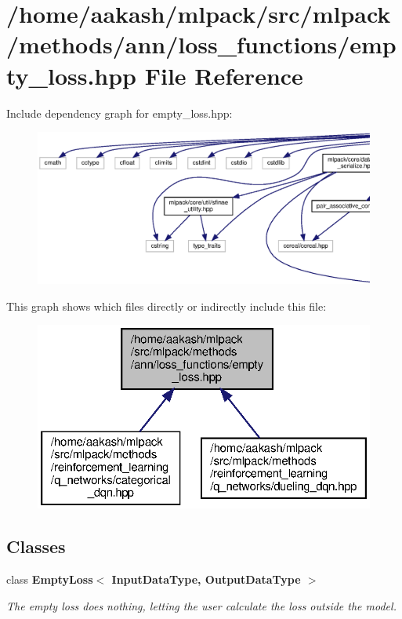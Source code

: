 \section{/home/aakash/mlpack/src/mlpack/methods/ann/loss\+\_\+functions/empty\+\_\+loss.hpp File Reference}
\label{empty__loss_8hpp}
Include dependency graph for empty\+\_\+loss.\+hpp\+:
\nopagebreak
\begin{figure}[H]
\begin{center}
\leavevmode
\includegraphics[width=350pt]{empty__loss_8hpp__incl}
\end{center}
\end{figure}
This graph shows which files directly or indirectly include this file\+:
\nopagebreak
\begin{figure}[H]
\begin{center}
\leavevmode
\includegraphics[width=326pt]{empty__loss_8hpp__dep__incl}
\end{center}
\end{figure}
\subsection*{Classes}
\begin{DoxyCompactItemize}
\item 
class \textbf{ Empty\+Loss$<$ Input\+Data\+Type, Output\+Data\+Type $>$}
\begin{DoxyCompactList}\small\item\em The empty loss does nothing, letting the user calculate the loss outside the model. \end{DoxyCompactList}\end{DoxyCompactItemize}
